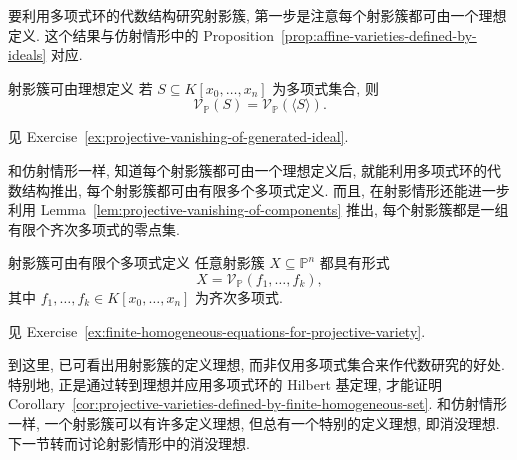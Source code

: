 要利用多项式环的代数结构研究射影簇, 第一步是注意每个射影簇都可由一个理想定义. 这个结果与仿射情形中的 Proposition~\ref{prop:affine-varieties-defined-by-ideals} 对应.

\begin{Proposition}{射影簇可由理想定义}\leavevmode\label{prop:projective-varieties-defined-by-ideals}
若 $S\subseteq K[x_{0},\ldots,x_{n}]$ 为多项式集合, 则
\[
  \mathcal{V}_{\mathbb{P}}(S)=\mathcal{V}_{\mathbb{P}}(\langle S\rangle).
\]
\end{Proposition}
\begin{Proof}
见 Exercise~\ref{ex:projective-vanishing-of-generated-ideal}.
\end{Proof}

和仿射情形一样, 知道每个射影簇都可由一个理想定义后, 就能利用多项式环的代数结构推出, 每个射影簇都可由有限多个多项式定义. 而且, 在射影情形还能进一步利用 Lemma~\ref{lem:projective-vanishing-of-components} 推出, 每个射影簇都是一组有限个齐次多项式的零点集.

\begin{Corollary}{射影簇可由有限个多项式定义}\leavevmode\label{cor:projective-varieties-defined-by-finite-homogeneous-set}
任意射影簇 $X\subseteq\mathbb{P}^{n}$ 都具有形式
\[
  X=\mathcal{V}_{\mathbb{P}}(f_{1},\ldots,f_{k}),
\]
其中 $f_{1},\ldots,f_{k}\in K[x_{0},\ldots,x_{n}]$ 为齐次多项式.
\end{Corollary}
\begin{Proof}
见 Exercise~\ref{ex:finite-homogeneous-equations-for-projective-variety}.
\end{Proof}

到这里, 已可看出用射影簇的定义理想, 而非仅用多项式集合来作代数研究的好处. 特别地, 正是通过转到理想并应用多项式环的 Hilbert 基定理, 才能证明 Corollary~\ref{cor:projective-varieties-defined-by-finite-homogeneous-set}. 和仿射情形一样, 一个射影簇可以有许多定义理想, 但总有一个特别的定义理想, 即消没理想. 下一节转而讨论射影情形中的消没理想.

